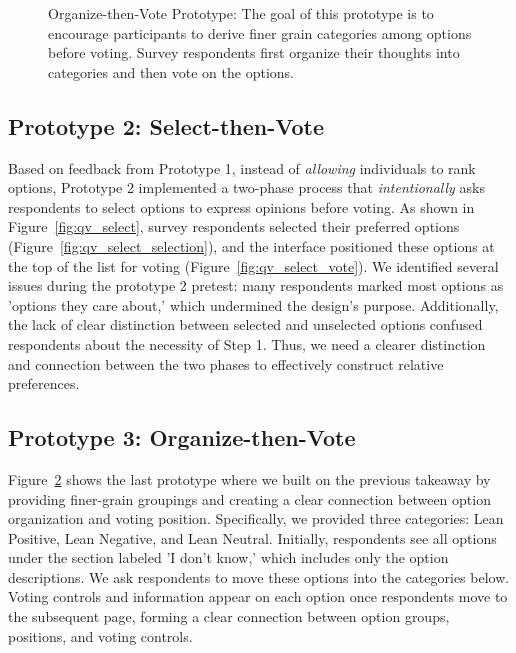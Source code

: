 \begin{figure}[p]
\begin{subfigure}[b]{0.45\textwidth}
        \label{fig:qv_org_p2}
    \end{subfigure}
    \caption{Organize-then-Vote Prototype: The goal of this prototype is to encourage participants to derive finer grain categories among options before voting. Survey respondents first organize their thoughts into categories and then vote on the options.}
    \label{fig:qv_org}
\end{figure}

\subsection{Prototype 2: Select-then-Vote}
Based on feedback from Prototype 1, instead of \textit{allowing} individuals to rank options, Prototype 2 implemented a two-phase process that \textit{intentionally} asks respondents to select options to express opinions before voting. As shown in Figure~\ref{fig:qv_select}, survey respondents selected their preferred options (Figure~\ref{fig:qv_select_selection}), and the interface positioned these options at the top of the list for voting (Figure~\ref{fig:qv_select_vote}). We identified several issues during the prototype 2 pretest: many respondents marked most options as 'options they care about,' which undermined the design's purpose. Additionally, the lack of clear distinction between selected and unselected options confused respondents about the necessity of Step 1. Thus, we need a clearer distinction and connection between the two phases to effectively construct relative preferences.

\subsection{Prototype 3: Organize-then-Vote}
Figure~\ref{fig:qv_org} shows the last prototype where we built on the previous takeaway by providing finer-grain groupings and creating a clear connection between option organization and voting position. Specifically, we provided three categories: Lean Positive, Lean Negative, and Lean Neutral. Initially, respondents see all options under the section labeled 'I don't know,' which includes only the option descriptions. We ask respondents to move these options into the categories below. Voting controls and information appear on each option once respondents move to the subsequent page, forming a clear connection between option groups, positions, and voting controls.

